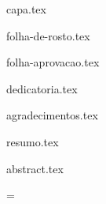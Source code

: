 \documentclass[titlepage,12pt,openright,oneside,sumario=tradicional,a4paper,english,article]{abntex2}
\begin{document}


%
%

{capa.tex}

\newpage
\thispagestyle{empty}

%
%

{folha-de-rosto.tex}
\thispagestyle{empty}

%
%


\newpage
\thispagestyle{empty}

%
%

%
{folha-aprovacao.tex}
\newpage
\thispagestyle{empty}

%
%

{dedicatoria.tex}


\newpage
\cleardoublepage


\pagestyle{plain}

\newpage
\thispagestyle{empty}

{agradecimentos.tex}
\thispagestyle{plain}
\newpage

{resumo.tex}
\thispagestyle{plain}

\newpage
{abstract.tex}
\newpage

\listoffigures
\newpage

\listoftables
\newpage

\tableofcontents
\newpage



\pagestyle{plain}
\setcounter{page}{1}

\pagestyle{fancy}
\addtolength{\headwidth}{\marginparsep}\addtolength{\headwidth}{\marginparwidth}\headwidth=\textwidth
\renewcommand{\sectionmark}[1]{\markboth{#1}{}}
\renewcommand{\sectionmark}[1]{\markright{\thesection\ #1}}\lhead[\fancyplain{}{\bfseries\thepage}]%
         {\fancyplain{}{\emph{\rightmark}}}\rhead[\fancyplain{}{\bfseries\leftmark}]%
             {\fancyplain{}{\bfseries\thepage}}\cfoot{}
\end{document}
